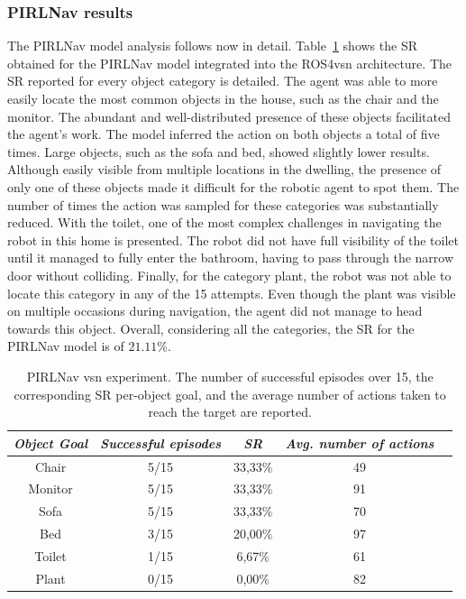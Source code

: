 \subsubsection{PIRLNav results}
\label{subsubsec:pirlnav_results}

The PIRLNav model analysis follows now in detail.
Table~\ref{tab:pirlnav} shows the SR obtained for the PIRLNav model integrated into the ROS4\acrshort{vsn} architecture.
The SR reported for every object category is detailed.
The agent was able to more easily locate the most common objects in the house, such as the chair and the monitor.
The abundant and well-distributed presence of these objects facilitated the agent's work.
The model inferred the action \stopac on both objects a total of five times.
Large objects, such as the sofa and bed, showed slightly lower results.
Although easily visible from multiple locations in the dwelling, the presence of only one of these objects made it difficult for the robotic agent to spot them.
The number of times the \stopac action was sampled for these categories was substantially reduced.
With the toilet, one of the most complex challenges in navigating the robot in this home is presented.
The robot did not have full visibility of the toilet until it managed to fully enter the bathroom, having to pass through the narrow door without colliding.
Finally, for the category plant, the robot was not able to locate this category in any of the 15 attempts.
Even though the plant was visible on multiple occasions during navigation, the agent did not manage to head towards this object.
Overall, considering all the categories, the SR for the PIRLNav model is of $21.11\%$.

\begin{table}[t]
\centering
\begin{tabular}{c|cccc}
\toprule
\textit{\textbf{Object Goal}} & \textit{\textbf{Successful episodes}} & \textit{\textbf{SR}} &  \textit{\textbf{Avg. number of actions}}   \\ \midrule
Chair                & 5/15     & 33,33\%   &   49  \\
Monitor              & 5/15     & 33,33\%   &   91  \\
Sofa                 & 5/15     & 33,33\%   &   70  \\
Bed                  & 3/15     & 20,00\%   &   97  \\
Toilet               & 1/15     & 6,67\%    &   61  \\
Plant                & 0/15     & 0,00\%    &   82  \\ \bottomrule
\end{tabular}
\caption{PIRLNav \acrshort{vsn} experiment. The number of successful episodes over 15, the corresponding SR per-object goal, and the average number of actions taken to reach the target are reported.}
\label{tab:pirlnav}
\end{table}

